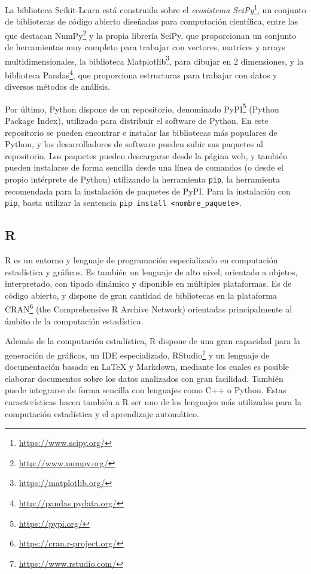 La biblioteca Scikit-Learn está construida sobre el \emph{ecosistema SciPy}\footnote{\url{https://www.scipy.org/}}, un conjunto de bibliotecas de código abierto diseñadas para computación científica, entre las que destacan NumPy\footnote{\url{http://www.numpy.org/}} y la propia librería SciPy, que proporcionan un conjunto de herramientas muy completo para trabajar con vectores, matrices y arrays multidimensionales, la biblioteca Matplotlib\footnote{\url{https://matplotlib.org/}}, para dibujar en 2 dimensiones, y la biblioteca Pandas\footnote{\url{http://pandas.pydata.org/}}, que proporciona estructuras para trabajar con datos y diversos métodos de análisis.

Por último, Python dispone de un repositorio, denominado PyPI\footnote{\url{https://pypi.org/}} (Python Package Index), utilizado para distribuir el software de Python. En este repositorio se pueden encontrar e instalar las bibliotecas más populares de Python, y los desarrolladores de software pueden subir sus paquetes al repositorio. Los paquetes pueden descargarse desde la página web, y también pueden instalarse de forma sencilla desde una línea de comandos (o desde el propio intérprete de Python) utilizando la herramienta \texttt{pip}, la herramienta recomendada para la instalación de paquetes de PyPI. Para la instalación con \texttt{pip}, basta utilizar la sentencia \texttt{pip install <nombre_paquete>}.

\subsection{R}

R \cite{R} es un entorno y lenguaje de programación especializado en computación estadística y gráficos. Es también un lenguaje de alto nivel, orientado a objetos, interpretado, con tipado dinámico y diponible en múltiples plataformas. Es de código abierto, y dispone de gran cantidad de bibliotecas en la plataforma CRAN\footnote{\url{https://cran.r-project.org/}} (the Comprehensive R Archive Network) orientadas principalmente al ámbito de la computación estadística.

Además de la computación estadística, R dispone de una gran capacidad para la generación de gráficos, un IDE especializado, RStudio\footnote{\url{https://www.rstudio.com/}} y un lenguaje de documentación basado en LaTeX y Markdown, mediante los cuales es posible elaborar documentos sobre los datos analizados con gran facilidad. También puede integrarse de forma sencilla con lenguajes como C++ o Python. Estas características hacen también a R ser uno de los lenguajes más utilizados para la computación estadística y el aprendizaje automático.

